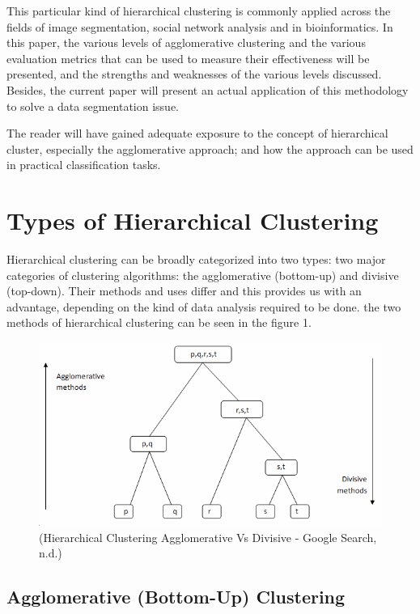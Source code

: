 \documentclass[conference]{IEEEtran}
\begin{document}
This particular kind of hierarchical clustering is commonly applied across the fields of image segmentation, social network analysis and in bioinformatics. In this paper, the various levels of agglomerative clustering and the various evaluation metrics that can be used to measure their effectiveness will be presented, and the strengths and weaknesses of the various levels discussed. Besides, the current paper will present an actual application of this methodology to solve a data segmentation issue.\cite{roux2018comparative}

The reader will have gained adequate exposure to the concept of hierarchical cluster, especially the agglomerative approach; and how the approach can be used in practical classification tasks.



\section{Types of Hierarchical Clustering}
Hierarchical clustering can be broadly categorized into two types: two major categories of clustering algorithms: the agglomerative (bottom-up) and divisive (top-down). Their methods and uses differ and this provides us with an advantage, depending on the kind of data analysis required to be done. the two methods of hierarchical clustering can be seen in the figure 1.\cite{day1984efficient}
\begin{figure}
    \centering
    \includegraphics[width=0.9\linewidth]{Difference-between-agglomerative-and-divisive-hierarchical-clustering-methods.png}
\caption{(Hierarchical Clustering Agglomerative Vs Divisive - Google Search, n.d.\cite{Agglomerative_Vs_Divisive})}
    \label{fig:enter-label}
\end{figure}

\subsection{Agglomerative (Bottom-Up) Clustering}
\end{document}
